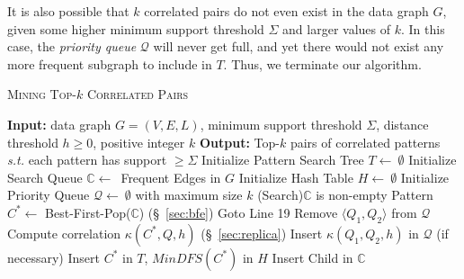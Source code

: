 It is also possible that $k$ correlated pairs do not even exist in the data graph $G$,
given some higher minimum support threshold $\Sigma$ and larger values of $k$. In this case, the {\em priority queue} $\mathcal{Q}$
will never get full, and yet there would not exist any more frequent subgraph to
include in $T$. Thus, we terminate our algorithm.
%
%
\begin{algorithm}[tb!]
{\scriptsize
 \dontprintsemicolon
 \caption{\textsc{Mining Top-$k$ Correlated Pairs}}
 \label{algo:exact}
 \nonl \textbf{Input:} data graph $G=(V,E,L)$, minimum support threshold $\Sigma$,
 distance threshold $h\ge0$, positive integer $k$ \;
 \nonl \textbf{Output:} Top-$k$ pairs of correlated patterns \emph{s.t.} each
 pattern has support $\ge \Sigma$  \;
 Initialize {\sf Pattern Search Tree} $T\leftarrow\ \emptyset$ \;
 Initialize {\sf Search Queue} $\mathbb{C} \leftarrow ${\sf\ Frequent Edges} in $G$\;
 Initialize {\sf Hash Table} $H\leftarrow\ \emptyset$ \; %
 Initialize {\sf Priority Queue} $\mathcal{Q}\leftarrow\ \emptyset$ with maximum size $k$ \; %
 \While(\tcp*[h]Search){\textup{$\mathbb{C}$ is non-empty}}
 {
   Pattern $C^* \leftarrow$ {\sf Best-First-Pop($\mathbb{C}$)} (\S~\ref{sec:bfe}) \;
   {
     Goto Line 19 \;
   }
   {
       {
         Remove $\langle Q_1,Q_2 \rangle$ from $\mathcal{Q}$ \;
       }
       {
         {
            Compute correlation $\kappa(C^{*},Q,h)$ (\S~\ref{sec:replica})\;
            Insert $\kappa(Q_1,Q_2,h)$ in $\mathcal{Q}$ (if necessary) \;
         }
       }
       Insert $C^*$ in $T$, $MinDFS(C^*)$ in $H$ \;
	   \;
       {
         {
           Insert {\sf Child} in $\mathbb{C}$ \;
         }
       }
   }
 }
 \;}
\end{algorithm}
%

